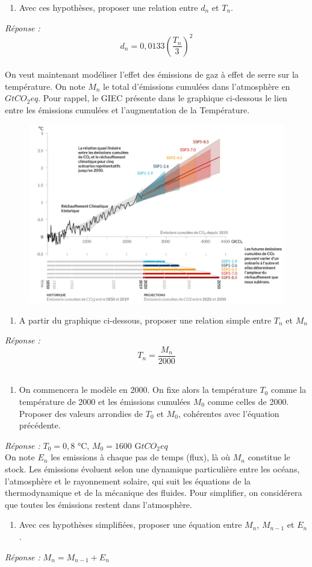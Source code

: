 \documentclass[12pt,a4paper]{article}
\newcommand{\tco}{tCO_2eq}
\newcommand{\ques}[1]{\begin{enumerate}[resume]
\item  #1
\end{enumerate}}
\newcommand{\rep}[1]{\textit{Réponse :} #1 \\}
\theoremstyle{remark}
\begin{document}
{\ques{  Avec ces hypothèses, proposer une relation entre $d_n$ et $T_n$. \label{ques:degat_nordhaus}
}
\rep{ \begin{equation*}
d_{n}=0,0133(\frac{T_n}{3})^2 \end{equation*}
}

On veut maintenant modéliser l'effet des émissions de gaz à effet de serre sur la température. On note $M_n$ le total d'émissions cumulées dans l'atmosphère en $G\tco$. Pour rappel, le GIEC présente dans le graphique ci-dessous le lien entre les émissions cumulées et l'augmentation de la Température.
\begin{figure}[h]
\centering
\includegraphics[scale=0.4]{images/Lien_GES_temperature.png}
\end{figure}


\ques{A partir du graphique ci-dessous, proposer une relation simple entre $T_n$ et $M_n$}
\rep{\begin{equation*} T_n= \frac{M_n}{2000}\end{equation*}}

\ques{On commencera le modèle en 2000. On fixe alors la température $T_0$ comme la température de 2000 et les émissions cumulées $M_0$ comme celles de 2000.
Proposer des valeurs arrondies de $T_0$ et $M_0$, cohérentes avec l'équation précédente.}
\rep{$T_0 = 0,8$ °C, $M_0 = 1600$ G$\tco$}

On note $E_n$ les emissions à chaque pas de temps (flux), là où $M_n$ constitue le stock.
Les émissions évoluent selon une dynamique particulière entre les océans, l'atmosphère et le rayonnement solaire, qui suit les équations de la thermodynamique et de la mécanique des fluides.
Pour simplifier, on considérera que toutes les émissions restent dans l'atmosphère.
\ques{ Avec ces hypothèses simplifiées, proposer une équation entre $M_n$, $M_{n-1}$ et $E_n$.}
\rep{$M_n =M_{n-1} +E_n$}

}
\end{document}
